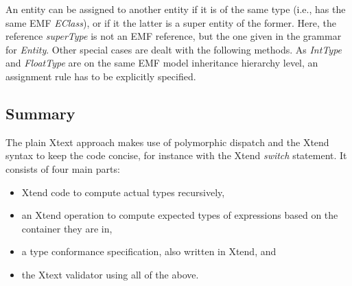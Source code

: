 An entity can be assigned to another entity if it is of the same type (i.e., has
the same EMF \emph{EClass}), or if it the latter is a super entity of the
former.
Here, the reference \emph{superType} is not an EMF reference, but the one given in the grammar for
\emph{Entity}. Other special cases are dealt with the following methods. As
\emph{IntType} and \emph{FloatType} are on the same EMF model inheritance
hierarchy level, an assignment rule has to be explicitly specified.



\subsection{Summary}
The plain Xtext approach makes use of polymorphic dispatch and the Xtend syntax
to keep the code concise, for instance with the Xtend \emph{switch} statement.
It consists of four main parts:
\begin{itemize}
\item Xtend code to compute actual types recursively,
\item an Xtend operation to compute expected types of expressions based on the container they are in,
\item a type conformance specification, also written in Xtend, and
\item the Xtext validator using all of the above.
\end{itemize}

